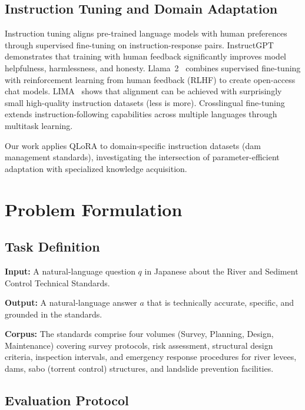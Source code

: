 \documentclass[twocolumn]{article}
\begin{document}
\subsection{Instruction Tuning and Domain Adaptation}

Instruction tuning aligns pre-trained language models with human preferences through
supervised fine-tuning on instruction-response pairs.
InstructGPT~\cite{ouyang2022instructgpt} demonstrates that training with human feedback
significantly improves model helpfulness, harmlessness, and honesty.
Llama~2~\cite{touvron2023llama2} combines supervised fine-tuning with reinforcement learning
from human feedback (RLHF) to create open-access chat models.
LIMA~\cite{zhou2023lima} shows that alignment can be achieved with surprisingly small
high-quality instruction datasets (less is more).
Crosslingual fine-tuning~\cite{muennighoff2023scaling} extends instruction-following
capabilities across multiple languages through multitask learning.

Our work applies QLoRA to domain-specific instruction datasets (dam management standards),
investigating the intersection of parameter-efficient adaptation with specialized knowledge
acquisition.

\section{Problem Formulation}
\label{sec:problem}

\subsection{Task Definition}

\textbf{Input:} A natural-language question $q$ in Japanese about the River and Sediment
Control Technical Standards.

\textbf{Output:} A natural-language answer $a$ that is technically accurate, specific,
and grounded in the standards.

\textbf{Corpus:} The standards comprise four volumes (Survey, Planning, Design, Maintenance)
covering survey protocols, risk assessment, structural design criteria, inspection intervals,
and emergency response procedures for river levees, dams, sabo (torrent control) structures,
and landslide prevention facilities.

\subsection{Evaluation Protocol}
\end{document}
